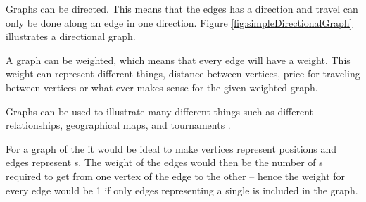Graphs can be directed. This means that the edges has a direction and travel can only be done along an edge in one direction. Figure \ref{fig:simpleDirectionalGraph} illustrates a directional graph. 

A graph can be weighted, which means that every edge will have a weight.
This weight can represent different things, distance between vertices, price for traveling between vertices or what ever makes sense for the given weighted graph.

\begin{figure}[htb]
	\centering
		\hspace{0.1\textwidth}
		\hspace{0.1\textwidth}
		\caption{}
		\label{fig:exampleGraphs}
\end{figure}

Graphs can be used to illustrate many different things such as different relationships, geographical maps, and tournaments \cite[pp. 592-593]{Rosen07}. 

For a graph of the \rubik{} it would be ideal to make vertices represent positions and edges represent \twist{}s. The weight of the edges would then be the number of \twist{}s required to get from one vertex of the edge to the other -- hence the weight for every edge would be 1 if only edges representing a single \twist{} is included in the graph.

